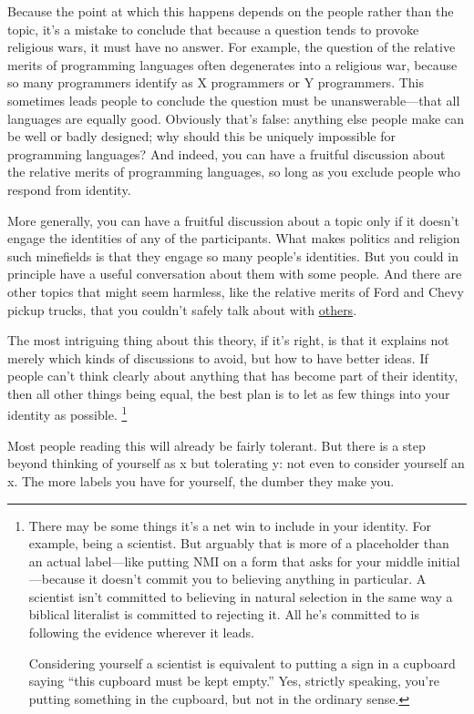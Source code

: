 \documentclass[12pt]{book}
\begin{document}
Because the point at which this happens depends on the people rather
than the topic, it's a mistake to conclude that because a question tends
to provoke religious wars, it must have no answer. For example, the
question of the relative merits of programming languages often
degenerates into a religious war, because so many programmers identify
as X programmers or Y programmers. This sometimes leads people to
conclude the question must be unanswerable---that all languages are
equally good. Obviously that's false: anything else people make can be
well or badly designed; why should this be uniquely impossible for
programming languages? And indeed, you can have a fruitful discussion
about the relative merits of programming languages, so long as you
exclude people who respond from identity.

More generally, you can have a fruitful discussion about a topic only if
it doesn't engage the identities of any of the participants. What makes
politics and religion such minefields is that they engage so many
people's identities. But you could in principle have a useful
conversation about them with some people. And there are other topics
that might seem harmless, like the relative merits of Ford and Chevy
pickup trucks, that you couldn't safely talk about with
\href{http://www.theledger.com/apps/pbcs.dll/article?AID=/20060418/NEWS/604180378/1039}{others}.

The most intriguing thing about this theory, if it's right, is that it
explains not merely which kinds of discussions to avoid, but how to have
better ideas. If people can't think clearly about anything that has
become part of their identity, then all other things being equal, the
best plan is to let as few things into your identity as possible.
\footnote{There may be some things it's a net win to include in your
identity. For example, being a scientist. But arguably that is more of a
placeholder than an actual label---like putting NMI on a form that asks
for your middle initial---because it doesn't commit you to believing
anything in particular. A scientist isn't committed to believing in
natural selection in the same way a biblical literalist is committed to
rejecting it. All he's committed to is following the evidence wherever
it leads.

Considering yourself a scientist is equivalent to putting a sign in a
cupboard saying ``this cupboard must be kept empty.'' Yes, strictly
speaking, you're putting something in the cupboard, but not in the
ordinary sense.}

Most people reading this will already be fairly tolerant. But there is a
step beyond thinking of yourself as x but tolerating y: not even to
consider yourself an x. The more labels you have for yourself, the
dumber they make you.
\end{document}
